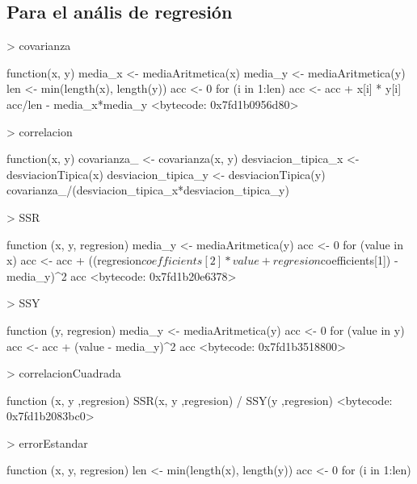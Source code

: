 \documentclass [a4paper] {article}
\begin{document}
\subsection{Para el anális de regresión}
\begin{Schunk}
\begin{Sinput}
> covarianza
\end{Sinput}
\begin{Soutput}
function(x, y) {
  media_x <- mediaAritmetica(x)
  media_y <- mediaAritmetica(y)
  len <- min(length(x), length(y))
  acc <- 0
  for (i in 1:len) {
    acc <- acc + x[i] * y[i]
  }
  acc/len - media_x*media_y
}
<bytecode: 0x7fd1b0956d80>
\end{Soutput}
\begin{Sinput}
> correlacion
\end{Sinput}
\begin{Soutput}
function(x, y) {
  covarianza_ <- covarianza(x, y)
  desviacion_tipica_x <- desviacionTipica(x)
  desviacion_tipica_y <- desviacionTipica(y)
  covarianza_/(desviacion_tipica_x*desviacion_tipica_y)
}
\end{Soutput}
\begin{Sinput}
> SSR
\end{Sinput}
\begin{Soutput}
function (x, y, regresion){
  media_y <- mediaAritmetica(y)
  acc <- 0
  for (value in x){
    acc <- acc + ((regresion$coefficients[2]*value+regresion$coefficients[1]) - media_y)^2
  }
  acc
}
<bytecode: 0x7fd1b20e6378>
\end{Soutput}
\begin{Sinput}
> SSY
\end{Sinput}
\begin{Soutput}
function (y, regresion){
  media_y <- mediaAritmetica(y)
  acc <- 0
  for (value in y){
    acc <- acc + (value - media_y)^2
  }
  acc
}
<bytecode: 0x7fd1b3518800>
\end{Soutput}
\begin{Sinput}
> correlacionCuadrada
\end{Sinput}
\begin{Soutput}
function (x, y ,regresion){
  SSR(x, y ,regresion) / SSY(y ,regresion)
}
<bytecode: 0x7fd1b2083bc0>
\end{Soutput}
\begin{Sinput}
> errorEstandar
\end{Sinput}
\begin{Soutput}
function (x, y, regresion) {
  len <- min(length(x), length(y))
  acc <- 0
  for (i in 1:len){
}}
\end{Soutput}
\end{Schunk}
\end{document}
